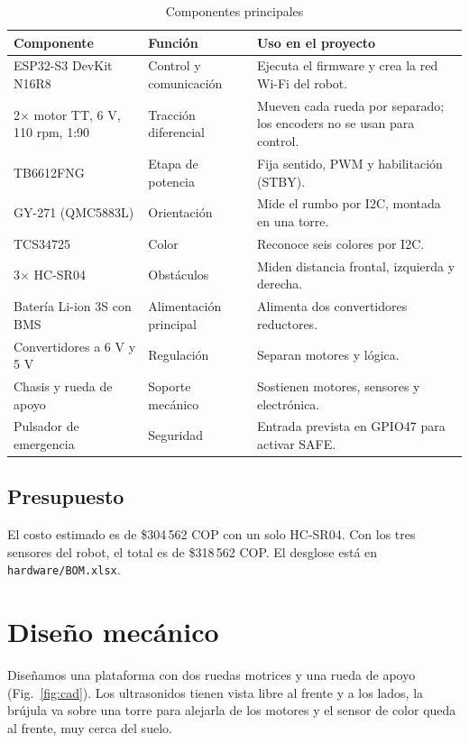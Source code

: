 \documentclass[journal]{IEEEtran}
\begin{document}
\begin{table}[t]
\centering
\caption{Componentes principales}
\label{tab:componentes}
\scriptsize
\begin{tabular}{p{} p{} p{}}
\toprule
\textbf{Componente} & \textbf{Función} & \textbf{Uso en el proyecto} \\
\midrule
ESP32-S3 DevKit N16R8 & Control y comunicación & Ejecuta el firmware y crea la red Wi-Fi del robot. \\
2$\times$ motor TT, 6 V, 110 rpm, 1:90 & Tracción diferencial & Mueven cada rueda por separado; los encoders no se usan para control. \\
TB6612FNG & Etapa de potencia & Fija sentido, PWM y habilitación (STBY). \\
GY-271 (QMC5883L) & Orientación & Mide el rumbo por I2C, montada en una torre. \\
TCS34725 & Color & Reconoce seis colores por I2C. \\
3$\times$ HC-SR04 & Obstáculos & Miden distancia frontal, izquierda y derecha. \\
Batería Li-ion 3S con BMS & Alimentación principal & Alimenta dos convertidores reductores. \\
Convertidores a 6 V y 5 V & Regulación & Separan motores y lógica. \\
Chasis y rueda de apoyo & Soporte mecánico & Sostienen motores, sensores y electrónica. \\
Pulsador de emergencia & Seguridad & Entrada prevista en GPIO47 para activar SAFE. \\
\bottomrule
\end{tabular}
\end{table}

\subsection{Presupuesto}

El costo estimado es de \$304\,562 COP con un solo HC-SR04. Con los tres sensores del robot, el total es de \$318\,562 COP. El desglose está en \texttt{hardware/BOM.xlsx}.

\section{Diseño mecánico}

Diseñamos una plataforma con dos ruedas motrices y una rueda de apoyo (Fig.~\ref{fig:cad}). Los ultrasonidos tienen vista libre al frente y a los lados, la brújula va sobre una torre para alejarla de los motores y el sensor de color queda al frente, muy cerca del suelo.
\end{document}
